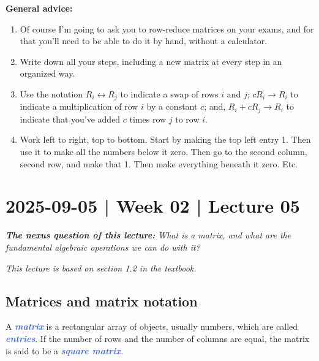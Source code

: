 \documentclass[10pt]{article}
\newcommand{\demph}[1]{\textcolor{RoyalBlue}{\textbf{\slshape #1}}} %
\theoremstyle{definition}
\newcommand{\fl}[1]{\noindent\textbf{#1}}            %
\begin{document}
\fl{General advice:}
\begin{enumerate}
  \item Of course I'm going to ask you to row-reduce matrices on your exams,
  and for that you'll need to be able to do it by hand, without a calculator.
  \item Write down all your steps, including a new matrix at every step in an
  organized way.
  \item Use the notation $R_{i}\leftrightarrow R_{j}$ to indicate a swap of
  rows $i$ and $j$; $cR_{i}\to R_{i}$ to indicate a multiplication of row $i$
  by a constant $c$; and, $R_{i}+cR_{j}\to R_{i}$ to indicate that you've
  added $c$ times row $j$ to row $i$.
  \item Work left to right, top to bottom. Start by making the top left entry
  1. Then use it to make all the numbers below it zero. Then go to the second
  column, second row, and make that 1. Then make everything beneath it zero.
  Etc.
\end{enumerate}

\newpage
\section{2025-09-05 | Week 02 | Lecture 05}

\begin{center}
  \begin{tcolorbox}[width=0.9\textwidth, colback=white, colframe=black]
    \textit{\textbf{The nexus question of this lecture:} What is a matrix, and
      what are the fundamental algebraic operations we can do with it?}
  \end{tcolorbox}
\end{center}

\textit{This lecture is based on section 1.2 in the textbook.}

\subsection{Matrices and matrix notation}

A \demph{matrix} is a rectangular array of objects, usually numbers, which are
called \demph{entries}. If the number of rows and the number of columns are
equal, the matrix is said to be a \demph{square matrix}.
\end{document}
